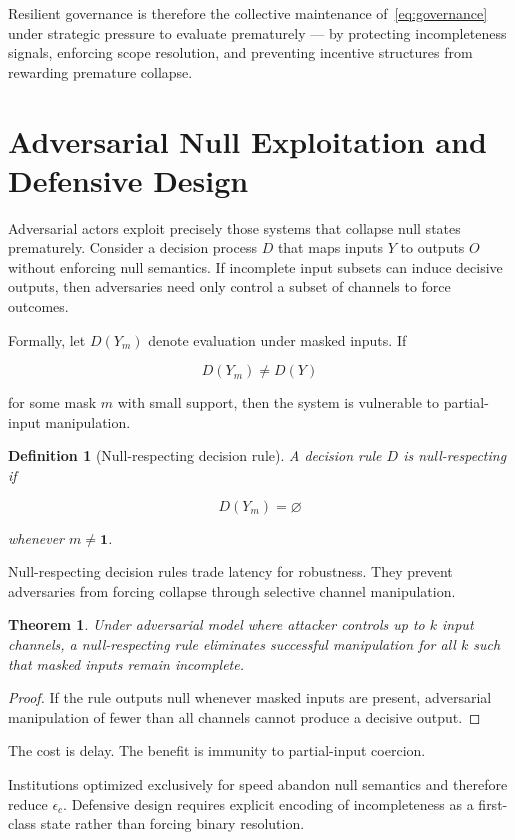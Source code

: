 \documentclass[11pt]{article}
\newtheorem{theorem}{Theorem}
\newtheorem{definition}{Definition}
\theoremstyle{remark}
\begin{document}
Resilient governance is therefore the collective maintenance of~\eqref{eq:governance} under strategic pressure to evaluate prematurely --- by protecting incompleteness signals, enforcing scope resolution, and preventing incentive structures from rewarding premature collapse.

\section{Adversarial Null Exploitation and Defensive Design}
\label{sec:adversarial}

Adversarial actors exploit precisely those systems that collapse null states prematurely. Consider a decision process $D$ that maps inputs $Y$ to outputs $O$ without enforcing null semantics. If incomplete input subsets can induce decisive outputs, then adversaries need only control a subset of channels to force outcomes.

Formally, let $D(Y_m)$ denote evaluation under masked inputs. If

\[
D(Y_m) \neq D(Y)
\]

for some mask $m$ with small support, then the system is vulnerable to partial-input manipulation.

\begin{definition}[Null-respecting decision rule]
A decision rule $D$ is null-respecting if

\[
D(Y_m) = \varnothing
\]

whenever $m \neq \mathbf{1}$.
\end{definition}

Null-respecting decision rules trade latency for robustness. They prevent adversaries from forcing collapse through selective channel manipulation.

\begin{theorem}
Under adversarial model where attacker controls up to $k$ input channels, a null-respecting rule eliminates successful manipulation for all $k$ such that masked inputs remain incomplete.
\end{theorem}

\begin{proof}
If the rule outputs null whenever masked inputs are present, adversarial manipulation of fewer than all channels cannot produce a decisive output.
\end{proof}

The cost is delay. The benefit is immunity to partial-input coercion.

Institutions optimized exclusively for speed abandon null semantics and therefore reduce $\epsilon_c$. Defensive design requires explicit encoding of incompleteness as a first-class state rather than forcing binary resolution.
\end{document}
